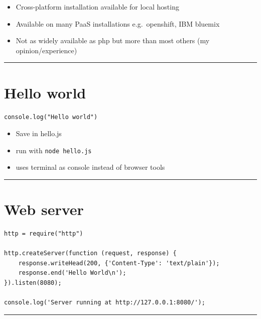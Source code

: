 \documentclass{article}[18pt]
\providecommand{\tightlist}{%
	\setlength{\itemsep}{0pt}\setlength{\parskip}{0pt}}
\begin{document}
\begin{itemize}
	\tightlist
	\item
	Cross-platform installation available for local hosting
	\item
	Available on many PaaS installations e.g.~openshift, IBM bluemix
	\item
	Not as widely available as php but more than most others (my
	opinion/experience)
\end{itemize}

\begin{center}\rule{0.5\linewidth}{\linethickness}\end{center}

\hypertarget{hello-world}{%
	\section{Hello world}\label{hello-world}}

\begin{verbatim}
console.log("Hello world")
\end{verbatim}


\begin{itemize}
	\tightlist
	\item
	Save in hello.js
	\item
	run with \texttt{node\ hello.js}
	\item
	uses terminal as console instead of browser tools
\end{itemize}

\begin{center}\rule{0.5\linewidth}{\linethickness}\end{center}

\hypertarget{web-server}{%
	\section{Web server}\label{web-server}}

\begin{verbatim}
http = require("http")

http.createServer(function (request, response) {
	response.writeHead(200, {'Content-Type': 'text/plain'});
	response.end('Hello World\n');
}).listen(8080);

console.log('Server running at http://127.0.0.1:8080/');
\end{verbatim}

\begin{center}\rule{0.5\linewidth}{\linethickness}\end{center}
\end{document}
